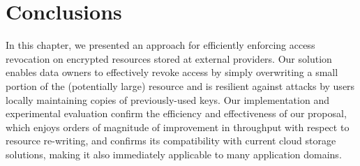 \section{Conclusions}\label{ms:sec:conclu}
In this chapter, we presented an approach for efficiently enforcing access revocation on encrypted resources stored at external providers. Our solution enables data owners to effectively revoke access by simply overwriting a small portion of the (potentially large) resource and is resilient against attacks by users locally maintaining copies of previously-used keys. Our implementation and experimental evaluation confirm the efficiency and effectiveness of our proposal, which enjoys orders of magnitude of improvement in throughput with respect to resource re-writing, and confirms its compatibility with current cloud storage solutions, making it also immediately applicable to many application domains.